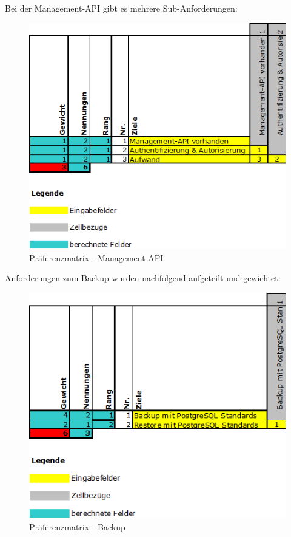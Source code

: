 \begin{flushleft}
    Bei der Management-API gibt es mehrere Sub-Anforderungen:
    \begin{figure}[H]
        \centering
        \includegraphics[width=1\linewidth]{source/implementation/evaluation/requirements/preference_matrix_management_api}
        \caption{Präferenzmatrix - Management-API}
        \label{fig:preference_matrix_management_api}
    \end{figure}
\end{flushleft}
\begin{flushleft}
    Anforderungen zum Backup wurden nachfolgend aufgeteilt und gewichtet:
    \begin{figure}[H]
        \centering
        \includegraphics[width=1\linewidth]{source/implementation/evaluation/requirements/preference_matrix_backup}
        \caption{Präferenzmatrix - Backup}
        \label{fig:preference_matrix_backup}
    \end{figure}
\end{flushleft}

